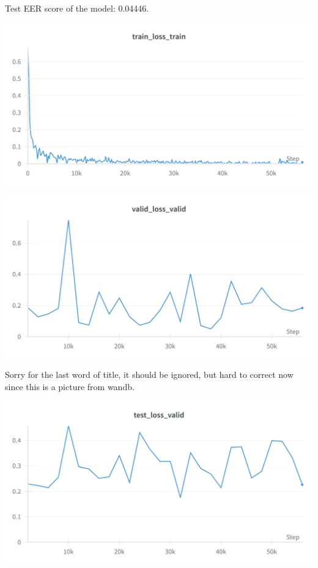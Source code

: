 \documentclass[a4paper]{article}
\begin{document}
Test EER score of the model: 0.04446.

\begin{center} \includegraphics[width=400pt]{train-loss.png} \end{center}

\begin{center} \includegraphics[width=400pt]{valid-loss.png} \end{center}

Sorry for the last word of title, it should be ignored, but hard to correct now since this is a picture from wandb.

\begin{center} \includegraphics[width=400pt]{test-loss.png} \end{center}
\end{document}
